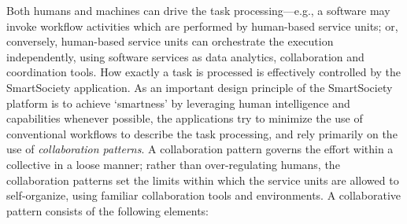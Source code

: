 \documentclass{llncs}
\begin{document}
      Both humans and machines can drive the task processing---e.g., a software may invoke workflow activities which are performed by  human-based service units; or, conversely, human-based service units can orchestrate the execution independently, using software services as data analytics, collaboration and coordination tools.
      How exactly a task is processed is effectively controlled by the SmartSociety application.  As an important design principle of the SmartSociety platform is to achieve `smartness' by leveraging human intelligence and capabilities whenever possible, the applications try to minimize the use of conventional workflows to describe the task processing, and rely primarily on the use of \emph{collaboration patterns}. 
      A collaboration pattern governs the effort within a collective in a loose manner; rather than over-regulating humans, the collaboration patterns set the limits within which the service units are allowed to self-organize, using familiar collaboration tools and environments. 
      A collaborative pattern consists of the following elements:
\end{document}
